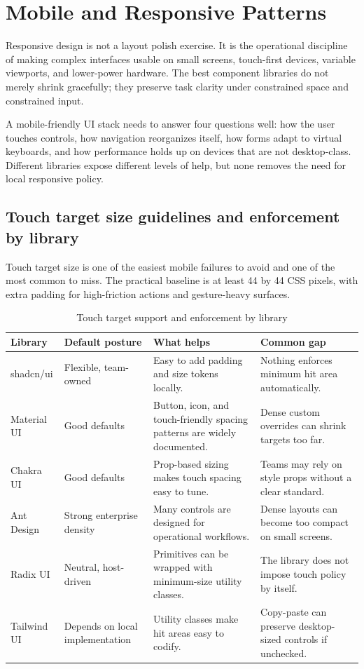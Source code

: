 \clearpage
\section{Mobile and Responsive Patterns}

Responsive design is not a layout polish exercise. It is the operational discipline of making complex interfaces usable on small screens, touch-first devices, variable viewports, and lower-power hardware. The best component libraries do not merely shrink gracefully; they preserve task clarity under constrained space and constrained input.

A mobile-friendly UI stack needs to answer four questions well: how the user touches controls, how navigation reorganizes itself, how forms adapt to virtual keyboards, and how performance holds up on devices that are not desktop-class. Different libraries expose different levels of help, but none removes the need for local responsive policy.

\subsection{Touch target size guidelines and enforcement by library}
Touch target size is one of the easiest mobile failures to avoid and one of the most common to miss. The practical baseline is at least 44 by 44 CSS pixels, with extra padding for high-friction actions and gesture-heavy surfaces.

\begin{table}[htbp]
  \centering
  \caption{Touch target support and enforcement by library}
  \begin{tabularx}{\textwidth}{@{}p{}p{}p{}Y@{}}
    \toprule
    \textbf{Library} & \textbf{Default posture} & \textbf{What helps} & \textbf{Common gap} \\
    \midrule
    shadcn/ui & Flexible, team-owned & Easy to add padding and size tokens locally. & Nothing enforces minimum hit area automatically. \\
    Material UI & Good defaults & Button, icon, and touch-friendly spacing patterns are widely documented. & Dense custom overrides can shrink targets too far. \\
    Chakra UI & Good defaults & Prop-based sizing makes touch spacing easy to tune. & Teams may rely on style props without a clear standard. \\
    Ant Design & Strong enterprise density & Many controls are designed for operational workflows. & Dense layouts can become too compact on small screens. \\
    Radix UI & Neutral, host-driven & Primitives can be wrapped with minimum-size utility classes. & The library does not impose touch policy by itself. \\
    Tailwind UI & Depends on local implementation & Utility classes make hit areas easy to codify. & Copy-paste can preserve desktop-sized controls if unchecked. \\
    \bottomrule
  \end{tabularx}
\end{table}

